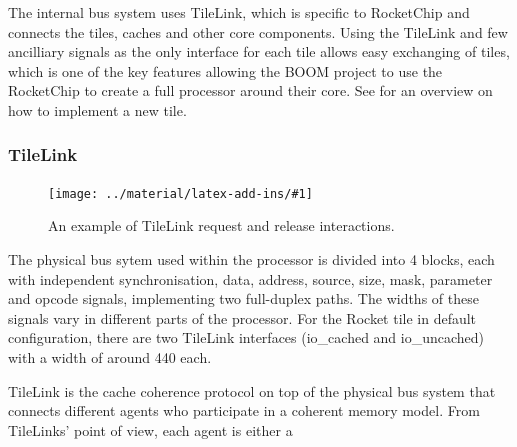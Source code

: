 \documentclass[journal,a4paper]{IEEEtran}
\newcommand*{\COMPILEIMAGES}{}%
\newcommand\inputimage[1]{%
	\ifdefined\COMPILEIMAGES
		
	\else
		\texttt{[image: ../material/latex-add-ins/\#1]}
	\fi
}
\begin{document}
The internal bus system uses TileLink\cite{tilelink}, which is specific to RocketChip and connects the tiles, caches and other core components.
Using the TileLink and few ancilliary signals as the only interface for each tile allows easy exchanging of tiles, which is one of the key features allowing the BOOM project to use the RocketChip to create a full processor around their core.
See \cite{rcgen-tutorial} for an overview on how to implement a new tile.

\subsubsection{TileLink}

\begin{figure}%
	\centering
	\inputimage{image3}
	\caption{An example of TileLink request and release interactions.}
	\label{tile-transfer}
\end{figure}
The physical bus sytem used within the processor is divided into 4 blocks, each with independent synchronisation, data, address, source, size, mask, parameter and opcode signals, implementing two full-duplex paths.
The widths of these signals vary in different parts of the processor. For the Rocket tile in default configuration, there are two TileLink interfaces (io\_cached and io\_uncached) with a width of around 440 each.

TileLink is the cache coherence protocol on top of the physical bus system that connects different agents who participate in a coherent memory model. From TileLinks' point of view, each agent is either a
\end{document}
